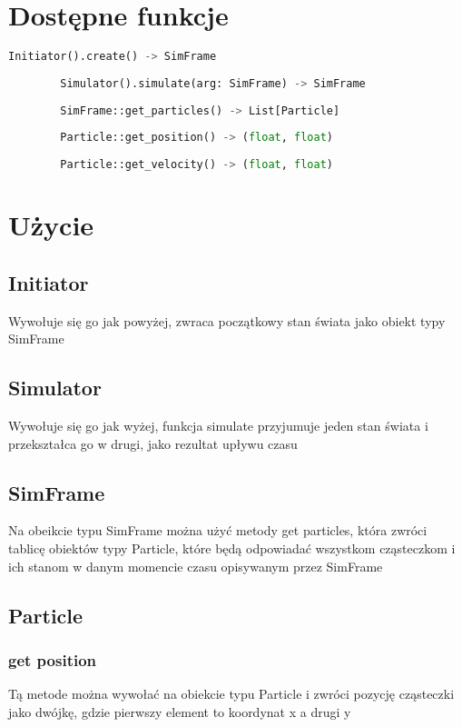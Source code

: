 \documentclass[]{article}
\title{}
\author{}
\begin{document}
\tableofcontents
\pagebreak

\section{Dostępne funkcje}
	\begin{lstlisting}[language=Python, gobble=12]
		Initiator().create() -> SimFrame
			
		Simulator().simulate(arg: SimFrame) -> SimFrame
		
		SimFrame::get_particles() -> List[Particle]
		
		Particle::get_position() -> (float, float)
		
		Particle::get_velocity() -> (float, float)
	\end{lstlisting}
\pagebreak

\section{Użycie}
	\subsection{Initiator}
		Wywołuje się go jak powyżej, zwraca początkowy stan świata jako obiekt typy SimFrame
		
	\subsection{Simulator}
		Wywołuje się go jak wyżej, funkcja simulate przyjumuje jeden stan świata i przekształca go w drugi, jako rezultat upływu czasu
		
	\subsection{SimFrame}
		Na obeikcie typu SimFrame można użyć metody get particles, która zwróci tablicę obiektów typy Particle, które będą odpowiadać wszystkom cząsteczkom i ich stanom w danym momencie czasu opisywanym przez SimFrame
		
	\subsection{Particle}
		\subsubsection{get position}
			Tą metode można wywołać na obiekcie typu Particle i zwróci pozycję cząsteczki jako dwójkę, gdzie pierwszy element to koordynat x a drugi y
\end{document}
